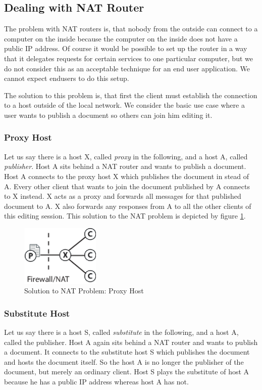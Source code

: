 \subsection{Dealing with NAT Router}
The problem with NAT routers is, that nobody from the outside can connect to a computer on the inside because the computer on the inside does not have a public IP address. Of course it would be possible to set up the router in a way that it delegates requests for certain services to one particular computer, but we do not consider this as an acceptable technique for an end user application. We cannot expect endusers to do this setup.

The solution to this problem is, that first the client must establish the connection to a host outside of the local network. We consider the basic use case where a user wants to publish a document so others can join him editing it. 

\subsubsection{Proxy Host}
Let us say there is a host X, called \emph{proxy} in the following, and a host A, called \emph{publisher}. Host A sits behind a NAT router and wants to publish a document. Host A connects to the proxy host X which publishes the document in stead of A. Every other client that wants to join the document published by A connects to X instead. X acts as a proxy and forwards all messages for that published document to A. X also forwards any responses from A to all the other clients of this editing session. This solution to the NAT problem is depicted by figure \ref{fig:proxy}.

\begin{figure}[H]
 \centering
 \includegraphics[width=3.8cm,height=2.9cm]{../../images/net_proxy.eps}
 \caption{Solution to NAT Problem: Proxy Host}
 \label{fig:proxy}
\end{figure}

\subsubsection{Substitute Host}
Let us say there is a host S, called \emph{substitute} in the following, and a host A, called the publisher. Host A again sits behind a NAT router and wants to publish a document. It connects to the substitute host S which publishes the document and hosts the document itself. So the host A is no longer the publisher of the document, but merely an ordinary client. Host S plays the substitute of host A because he has a public IP address whereas host A has not.

